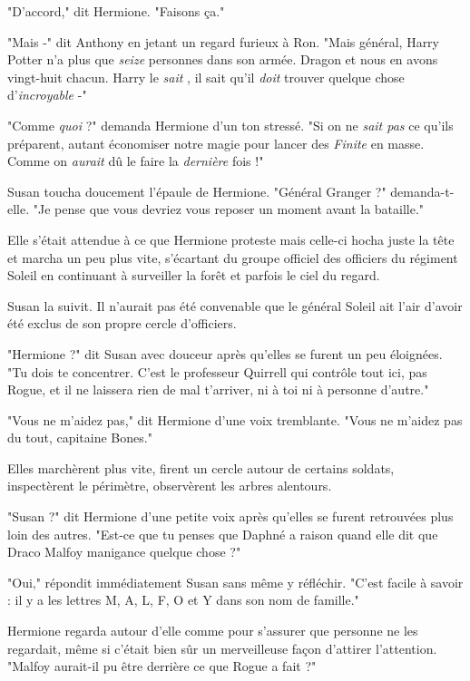 "D'accord," dit Hermione. "Faisons ça."

"Mais -" dit Anthony en jetant un regard furieux à Ron. "Mais général, Harry Potter n'a plus que \emph{seize}  personnes dans son armée. Dragon et nous en avons vingt-huit chacun. Harry le \emph{sait} , il sait qu'il \emph{doit}  trouver quelque chose d'\emph{incroyable}  -"

"Comme \emph{quoi}  ?" demanda Hermione d'un ton stressé. "Si on ne \emph{sait pas}  ce qu'ils préparent, autant économiser notre magie pour lancer des \emph{Finite}  en masse. Comme on \emph{aurait}  dû le faire la \emph{dernière}  fois !"

Susan toucha doucement l'épaule de Hermione. "Général Granger ?" demanda-t-elle. "Je pense que vous devriez vous reposer un moment avant la bataille."

Elle s'était attendue à ce que Hermione proteste mais celle-ci hocha juste la tête et marcha un peu plus vite, s'écartant du groupe officiel des officiers du régiment Soleil en continuant à surveiller la forêt et parfois le ciel du regard.

Susan la suivit. Il n'aurait pas été convenable que le général Soleil ait l'air d'avoir été exclus de son propre cercle d'officiers.

"Hermione ?" dit Susan avec douceur après qu'elles se furent un peu éloignées. "Tu dois te concentrer. C'est le professeur Quirrell qui contrôle tout ici, pas Rogue, et il ne laissera rien de mal t'arriver, ni à toi ni à personne d'autre."

"Vous ne m'aidez pas," dit Hermione d'une voix tremblante. "Vous ne m'aidez pas du tout, capitaine Bones."

Elles marchèrent plus vite, firent un cercle autour de certains soldats, inspectèrent le périmètre, observèrent les arbres alentours.

"Susan ?" dit Hermione d'une petite voix après qu'elles se furent retrouvées plus loin des autres. "Est-ce que tu penses que Daphné a raison quand elle dit que Draco Malfoy manigance quelque chose ?"

"Oui," répondit immédiatement Susan sans même y réfléchir. "C'est facile à savoir : il y a les lettres M, A, L, F, O et Y dans son nom de famille."

Hermione regarda autour d'elle comme pour s'assurer que personne ne les regardait, même si c'était bien sûr un merveilleuse façon d'attirer l'attention. "Malfoy aurait-il pu être derrière ce que Rogue a fait ?"

